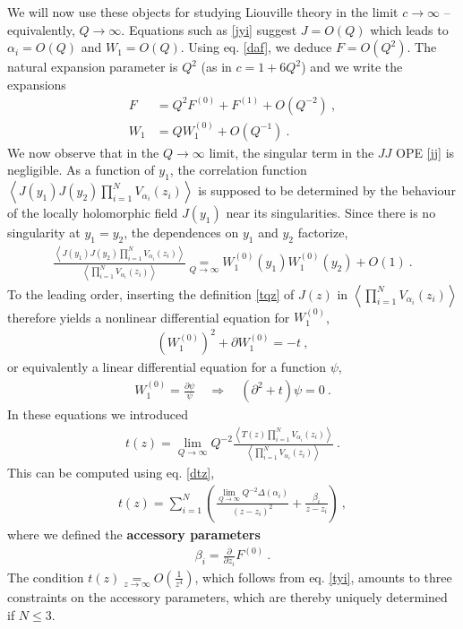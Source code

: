 \documentclass[12pt, a4paper, notitlepage, twoside]{report}
\numberwithin{equation}{section}
\theoremstyle{break}
\begin{document}
We will now use these objects for studying Liouville theory in the limit $c\to \infty$ -- equivalently, $Q\to \infty$.
Equations such as \eqref{jyi} suggest $J=O(Q)$ which leads to $\alpha_i=O(Q)$ and $W_1=O(Q)$.
Using eq. \eqref{daf}, we deduce $F=O(Q^2)$.
The natural expansion parameter is $Q^2$ (as in $c=1+6Q^2$) and we write the expansions
\begin{align}
 F &= Q^2 F^{(0)} + F^{(1)} + O(Q^{-2})\ ,
\\
W_1 & = QW_1^{(0)} + O(Q^{-1})\ .
\end{align}
We now observe that in the $Q\to \infty$ limit, the singular term in the $JJ$ OPE \eqref{jj} is negligible.
As a function of $y_1$, the correlation function $ \left\langle J(y_1)J(y_2)\prod_{i=1}^N V_{\alpha_i}(z_i) \right\rangle$ is supposed to be determined by the behaviour of the locally holomorphic field $J(y_1)$ near its singularities.
Since there is no singularity at $y_1=y_2$, the dependences on $y_1$ and $y_2$  factorize,    
\begin{align}
 \frac{\left\langle J(y_1)J(y_2)\prod_{i=1}^N V_{\alpha_i}(z_i)\right\rangle}{\left\langle \prod_{i=1}^N V_{\alpha_i}(z_i) \right\rangle} \underset{Q\to \infty}{=} W_1^{(0)}(y_1)W_1^{(0)}(y_2) + O(1)\ .
\end{align}
To the leading order, inserting the definition \eqref{tqz} of $J(z)$ in $\left\langle \prod_{i=1}^N V_{\alpha_i}(z_i) \right\rangle$ therefore yields a nonlinear differential equation for $W_1^{(0)}$,
\begin{align}
 \boxed{\left(W_1^{(0)}\right)^2 + \partial W_1^{(0)} = - t}\ ,
\label{wwwt}
\end{align}
or equivalently a linear differential equation for a function $\psi$,
\begin{align}
 \boxed{W_1^{(0)} = \frac{\partial\psi}{\psi} \quad \Rightarrow \quad (\partial^2 + t ) \psi = 0}\ .
\label{dtp}
\end{align}
In these equations we introduced
\begin{align}
 t(z) = \underset{Q\to \infty}{\lim} Q^{-2} \frac{\left\langle T(z) \prod_{i=1}^N V_{\alpha_i}(z_i) \right\rangle}{\left\langle \prod_{i=1}^N V_{\alpha_i}(z_i) \right\rangle}\ .
\end{align}
This can be computed using eq. \eqref{dtz}, 
\begin{align}
 t(z) = \sum_{i=1}^N \left( \frac{\underset{Q\to\infty}{\lim} Q^{-2}\Delta(\alpha_i)}{(z-z_i)^2} + \frac{\beta_i}{z-z_i} \right)\ ,
\label{tzs}
\end{align}
where we defined the \textbf{\boldmath accessory parameters} 
\begin{align}
 \beta_i = {\frac{\partial}{\partial z_i}} F^{(0)}\ .
\end{align}
The condition $t(z) \underset{z\to \infty}{=} O(\frac{1}{z^4})$, which follows from eq. \eqref{tyi}, amounts to three constraints on the accessory parameters, which are thereby uniquely determined if $N\leq 3$. 
\end{document}
